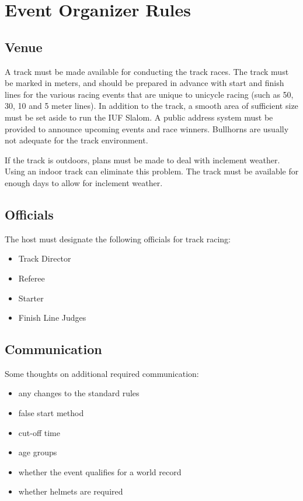 \chapter{Event Organizer Rules}

\section{Venue}

A track must be made available for conducting the track races.
The track must be marked in meters, and should be prepared in advance with start and finish lines for the various racing events that are unique to unicycle racing (such as 50, 30, 10 and 5 meter lines).
In addition to the track, a smooth area of sufficient size must be set aside to run the IUF Slalom.
A public address system must be provided to announce upcoming events and race winners.
Bullhorns are usually not adequate for the track environment.

If the track is outdoors, plans must be made to deal with inclement weather.
Using an indoor track can eliminate this problem.
The track must be available for enough days to allow for inclement weather.

\section{Officials}

The host must designate the following officials for track racing:
\begin{itemize}
\item Track Director
\item Referee
\item Starter
\item Finish Line Judges
\end{itemize}

\section{Communication}

\begin{comment2016}
Some thoughts on additional required communication:
\begin{itemize}
\item any changes to the standard rules
\item false start method
\item cut-off time
\item age groups
\item whether the event qualifies for a world record
\item whether helmets are required
\end{itemize}
\end{comment2016}

